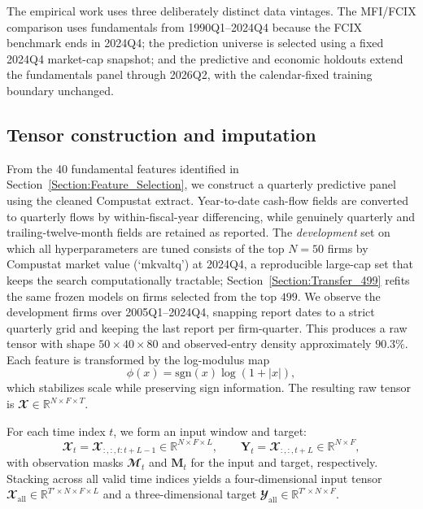\documentclass[pdflatex,sn-mathphys-num]{sn-jnl}%
\theoremstyle{thmstyleone}%
\theoremstyle{thmstyletwo}%
\theoremstyle{thmstylethree}%
\begin{document}
The empirical work uses three deliberately distinct data vintages. The MFI/FCIX comparison uses fundamentals from 1990Q1--2024Q4 because the FCIX benchmark ends in 2024Q4; the prediction universe is selected using a fixed 2024Q4 market-cap snapshot; and the predictive and economic holdouts extend the fundamentals panel through 2026Q2, with the calendar-fixed training boundary unchanged.

\subsection{Tensor construction and imputation}
\label{Section:Tensor_Imputation}

From the 40 fundamental features identified in Section~\ref{Section:Feature_Selection}, we construct a quarterly predictive panel using the cleaned Compustat extract. Year-to-date cash-flow fields are converted to quarterly flows by within-fiscal-year differencing, while genuinely quarterly and trailing-twelve-month fields are retained as reported. The \emph{development} set on which all hyperparameters are tuned consists of the top $N=50$ firms by Compustat market value (`mkvaltq') at 2024Q4, a reproducible large-cap set that keeps the search computationally tractable; Section~\ref{Section:Transfer_499} refits the same frozen models on firms selected from the top $499$. We observe the development firms over 2005Q1--2024Q4, snapping report dates to a strict quarterly grid and keeping the last report per firm-quarter. This produces a raw tensor with shape $50 \times 40 \times 80$ and observed-entry density approximately $90.3\%$. Each feature is transformed by the log-modulus map
\begin{equation}
\phi(x) = \mathrm{sgn}(x)\log(1 + |x|),
\end{equation}
which stabilizes scale while preserving sign information. The resulting raw tensor is $\mathbfcal{X} \in \mathbb{R}^{N \times F \times T}$.

For each time index $t$, we form an input window and target:
\begin{equation}
\mathbfcal{X}_t = \mathbfcal{X}_{:,:,t:t+L-1} \in \mathbb{R}^{N \times F \times L},
\qquad
\mathbf{Y}_t = \mathbfcal{X}_{:,:,t+L} \in \mathbb{R}^{N \times F},
\end{equation}
with observation masks $\mathbfcal{M}_t$ and $\mathbf{M}_t$ for the input and target, respectively. Stacking across all valid time indices yields a four-dimensional input tensor $\mathbfcal{X}_{\mathrm{all}} \in \mathbb{R}^{T' \times N \times F \times L}$ and a three-dimensional target $\mathbfcal{Y}_{\mathrm{all}} \in \mathbb{R}^{T' \times N \times F}$.
\end{document}

